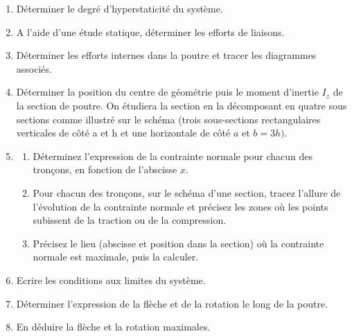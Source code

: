 \documentclass[lecture.tex]{subfiles}
\begin{document}
\begin{enumerate}
  \item Déterminer le degré d'hyperstaticité du système.
  \item A l'aide d'une étude statique, déterminer les efforts de liaisons.
  \item Déterminer les efforts internes dans la poutre et tracer les diagrammes associés.
  \item Déterminer la position du centre de géométrie puis le moment d'inertie $I_z$ de la section de poutre. On étudiera la section en la décomposant en quatre sous sections comme illustré sur le schéma (trois sous-sections rectangulaires verticales de côté a et h et une horizontale de côté $a$ et $b=3 h)$.
  \item %
  \begin{enumerate}
    \item Déterminez l'expression de la contrainte normale pour chacun des tronçons, en fonction de l'abscisse $x$.
    \item Pour chacun des tronçons, sur le schéma d'une section, tracez l'allure de l'évolution de la contrainte normale et précisez les zones où les points subissent de la traction ou de la compression.
    \item Précisez le lieu (abscisse et position dans la section) où la contrainte normale est maximale, puis la calculer.
  \end{enumerate}
  \item Ecrire les conditions aux limites du système.
  \item Déterminer l'expression de la flèche et de la rotation le long de la poutre.
  \item En déduire la flèche et la rotation maximales.
\end{enumerate}

\finexercice
\end{document}
